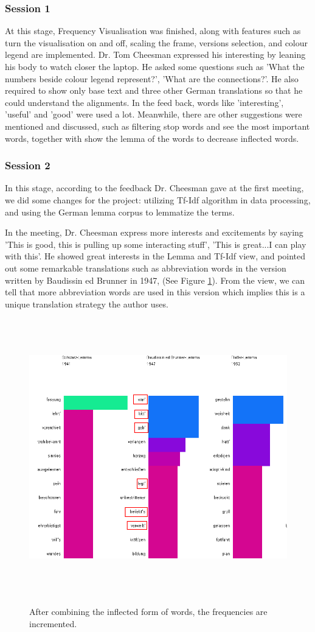 \subsubsection{Session 1}

At this stage, Frequency Visualisation was finished, along with features such as turn the visualisation on and off, scaling the frame, versions selection, and colour legend are implemented. Dr. Tom Cheesman expressed his interesting by leaning his body to watch closer the laptop. He asked some questions such as 'What the numbers beside colour legend represent?', 'What are the connections?'. He also required to show only base text and three other German translations so that he could understand the alignments. In the feed back, words like 'interesting', 'useful' and 'good' were used a lot. Meanwhile, there are other suggestions were mentioned and discussed, such as filtering stop words and see the most important words, together with show the lemma of the words to decrease inflected words.

\subsubsection{Session 2}

In this stage, according to the feedback Dr. Cheesman gave at the first meeting, we did some changes for the project: utilizing Tf-Idf algorithm in data processing, and using the German lemma corpus to lemmatize the terms. 

In the meeting, Dr. Cheesman express more interests and excitements by saying 'This is good, this is pulling up some interacting stuff', 'This is great...I can play with this'. He showed great interests in the Lemma and Tf-Idf view, and pointed out some remarkable translations such as abbreviation words in the version written by Baudissin ed Brunner in 1947, (See Figure \ref{fig:feedback}). From the view, we can tell that more abbreviation words are used in this version which implies this is a unique translation strategy the author uses.

\begin{figure}[h]
	\centering	
	\includegraphics[width=16cm, height=12cm]{Figs/Marking-Feedback}\\[1ex]
	\caption{} After combining the inflected form of words, the frequencies are incremented.
	\label{fig:feedback}
\end{figure} 




